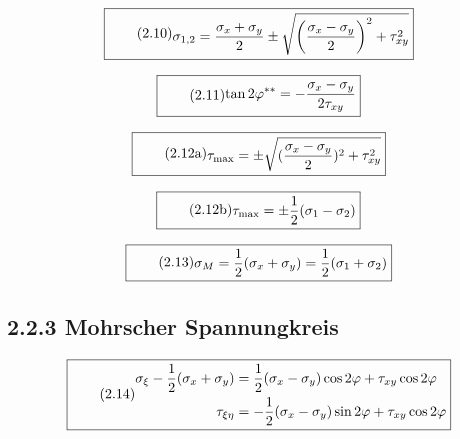 \documentclass[11pt]{article}
\newcommand{\1}{ {\mathds{1}} }
\begin{document}
    \begin{equation}
      \boxed{
        \tag{2.10}
        \begin{split}
          \sigma_{1,2}
          =
          \frac{\sigma_x + \sigma_y}{2}
          \pm
          \sqrt{\left(
            \frac{\sigma_x - \sigma_y}{2}
            \right)^2
            +
            \tau_{xy}^2
          }
        \end{split}
      }
    \end{equation}

    \begin{equation}
      \boxed{
        \tag{2.11}
        \begin{split}
          \tan 2\varphi^{\ast\ast}
          =
          -\frac{\sigma_x - \sigma_y}{2 \tau_{xy}}
        \end{split}
      }
    \end{equation}

    \begin{equation}
      \boxed{
        \tag{2.12a}
        \begin{split}
          \tau_{\text{max}}
          =
          \pm
          \sqrt{(\frac{\sigma_x - \sigma_y}{2})^2 + \tau_{xy}^2}
        \end{split}
      }
    \end{equation}

    \begin{equation}
      \boxed{
        \tag{2.12b}
        \begin{split}
          \tau_{\text{max}}
          =
          \pm
          \frac{1}{2}(\sigma_1 -\sigma_2)
        \end{split}
      }
    \end{equation}

    \begin{equation}
      \boxed{
        \tag{2.13}
        \begin{split}
          \sigma_M
          =
          \frac{1}{2}(\sigma_x + \sigma_y)
          =
          \frac{1}{2}(\sigma_1 + \sigma_2)
        \end{split}
      }
    \end{equation}

    \subsection*{2.2.3 Mohrscher Spannungkreis}

    \begin{equation}
      \boxed{
        \tag{2.14}
        \begin{split}
          \sigma_\xi-\frac{1}{2}(\sigma_x + \sigma_y)
          &=
          \frac{1}{2}(\sigma_x -\sigma_y)\cos 2\varphi + \tau_{xy}\cos 2 \varphi\\
          \tau_{\xi\eta}
          &=
          - \frac{1}{2}(\sigma_x - \sigma_y) \sin 2 \varphi + \tau_{xy} \cos 2\varphi
        \end{split}
      }
    \end{equation}    
\end{document}
